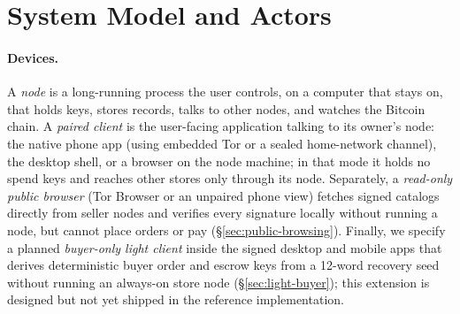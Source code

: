 \section{System Model and Actors}
\label{sec:model}

\paragraph{Devices.} A \emph{node} is a long-running process the user controls, on a computer that stays on, that holds keys, stores records, talks to other nodes, and watches the Bitcoin chain. A \emph{paired client} is the user-facing application talking to its owner's node: the native phone app (using embedded Tor or a sealed home-network channel), the desktop shell, or a browser on the node machine; in that mode it holds no spend keys and reaches other stores only through its node. Separately, a \emph{read-only public browser} (Tor Browser or an unpaired phone view) fetches signed catalogs directly from seller nodes and verifies every signature locally without running a node, but cannot place orders or pay (\S\ref{sec:public-browsing}). Finally, we specify a planned \emph{buyer-only light client} inside the signed desktop and mobile apps that derives deterministic buyer order and escrow keys from a 12-word recovery seed without running an always-on store node (\S\ref{sec:light-buyer}); this extension is designed but not yet shipped in the reference implementation.


